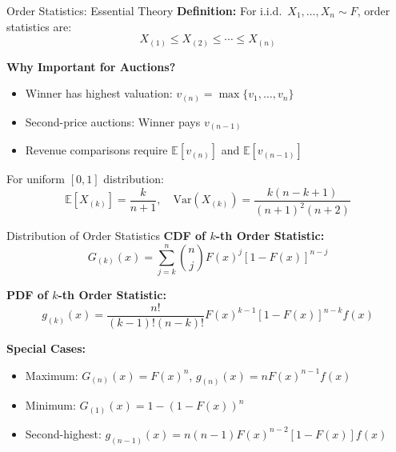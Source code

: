 \documentclass[xcolor={x11names}, aspectratio=169 ]{beamer}
\newcommand{\E}{\mathbb{E}}
\begin{document}
\begin{frame}{Order Statistics: Essential Theory}
\textbf{Definition:} For i.i.d.\ $X_1, \ldots, X_n \sim F$, order statistics are:
\[X_{(1)} \leq X_{(2)} \leq \cdots \leq X_{(n)}\]

\vspace{0.2cm}
\textbf{Why Important for Auctions?}
\begin{itemize}
  \item Winner has highest valuation: $v_{(n)} = \max\{v_1, \ldots, v_n\}$
  \item Second-price auctions: Winner pays $v_{(n-1)}$
  \item Revenue comparisons require $\mathbb{E}[v_{(n)}]$ and $\mathbb{E}[v_{(n-1)}]$
\end{itemize}

\begin{tcolorbox}[colback=blue!5!white,colframe=blue!75!black,title=Key Result]
For uniform $[0,1]$ distribution:
\[\E[X_{(k)}] = \frac{k}{n+1}, \quad \text{Var}(X_{(k)}) = \frac{k(n-k+1)}{(n+1)^2(n+2)}\]
\end{tcolorbox}
\end{frame}

\begin{frame}{Distribution of Order Statistics}
\textbf{CDF of $k$-th Order Statistic:}
\[G_{(k)}(x) = \sum_{j=k}^n \binom{n}{j} F(x)^j [1-F(x)]^{n-j}\]

\vspace{0.2cm}
\textbf{PDF of $k$-th Order Statistic:}
\[g_{(k)}(x) = \frac{n!}{(k-1)!(n-k)!} F(x)^{k-1}[1-F(x)]^{n-k}f(x)\]

\vspace{0.3cm}
\textbf{Special Cases:}
\begin{itemize}
  \item Maximum: $G_{(n)}(x) = F(x)^n$, \quad $g_{(n)}(x) = nF(x)^{n-1}f(x)$
  \item Minimum: $G_{(1)}(x) = 1-(1-F(x))^n$
  \item Second-highest: $g_{(n-1)}(x) = n(n-1)F(x)^{n-2}[1-F(x)]f(x)$
\end{itemize}
\end{frame}
\end{document}
